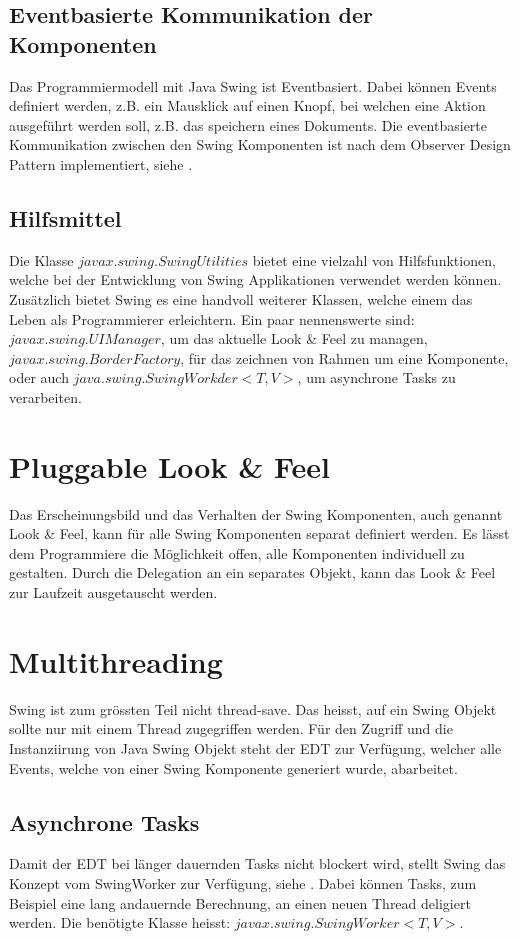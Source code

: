   \subsection{Eventbasierte Kommunikation der Komponenten}
  
  Das Programmiermodell mit Java Swing ist Eventbasiert. Dabei können Events
  definiert werden, z.B. ein Mausklick auf einen Knopf, bei welchen eine Aktion
  ausgeführt werden soll, z.B. das speichern eines Dokuments. Die eventbasierte
  Kommunikation zwischen den Swing Komponenten ist nach dem Observer Design
  Pattern implementiert, siehe \cite{ObserverDesignPattern}.
  
  \subsection{Hilfsmittel}
  
  Die Klasse \(javax.swing.SwingUtilities\) bietet eine vielzahl von
  Hilfsfunktionen, welche bei der Entwicklung von Swing Applikationen verwendet
  werden können. Zusätzlich bietet Swing es eine handvoll weiterer Klassen,
  welche einem das Leben als Programmierer erleichtern. Ein paar nennenswerte
  sind: \(javax.swing.UIManager\), um das aktuelle Look \& Feel zu managen,
  \(javax.swing.BorderFactory\), für das zeichnen von Rahmen um eine
  Komponente, oder auch \(java.swing.SwingWorkder<T,V>\), um asynchrone Tasks
  zu verarbeiten.
  
  \section{Pluggable Look \& Feel}
  
  Das Erscheinungsbild und das Verhalten der Swing Komponenten, auch genannt
  Look \& Feel, kann für alle Swing Komponenten separat definiert werden. Es
  lässt dem Programmiere die Möglichkeit offen, alle Komponenten individuell zu
  gestalten. Durch die Delegation an ein separates Objekt, kann das Look \& Feel
  zur Laufzeit ausgetauscht werden.
  
  \section{Multithreading}
  
  Swing ist zum grössten Teil nicht thread-save. Das heisst, auf ein Swing
  Objekt sollte nur mit einem Thread zugegriffen werden. Für den Zugriff und
  die Instanziirung von Java Swing Objekt steht der \ac{EDT} zur Verfügung,
  welcher alle Events, welche von einer Swing Komponente generiert wurde,
  abarbeitet.
  
  \subsection{Asynchrone Tasks}
  
  Damit der \ac{EDT} bei länger dauernden Tasks nicht blockert wird, stellt
  Swing das Konzept vom SwingWorker zur Verfügung, siehe \cite{SwingWorker}.
  Dabei können Tasks, zum Beispiel eine lang andauernde Berechnung, an einen
  neuen Thread deligiert werden. Die benötigte Klasse heisst: 
  \(javax.swing.SwingWorker<T,V>\).  
